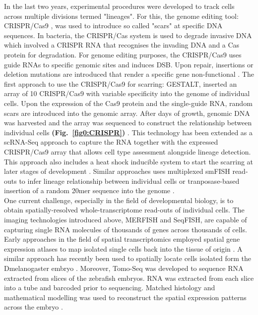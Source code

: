 In the last two years, experimental procedures were developed to track cells across multiple divisions termed "lineages". For this, the genome editing tool: \gls{CRISPR}/\gls{Cas9} \citep{Jinek2012}, was used to introduce so called "scars" at specific DNA sequences. In bacteria, the CRISPR/Cas system is used to degrade invasive DNA which involved a CRISPR RNA that recognises the invading DNA and a Cas protein for degradation. For genome editing purposes, the \gls{CRISPR}/\gls{Cas9} uses guide RNAs to specific genomic sites and induces \gls{DSB}. Upon repair, insertions or deletion mutations are introduced that render a specific gene non-functional \citep{Zhang2014c}. The first approach to use the 	\gls{CRISPR}/\gls{Cas9} for scarring: \gls{GESTALT}, inserted an array of 10 \gls{CRISPR}/\gls{Cas9} with variable specificity into the genome of individual cells. Upon the expression of the Cas9 protein and the single-guide RNA, random scars are introduced into the genomic array. After days of growth, genomic DNA was harvested and the array was sequenced to construct the relationship between individual cells \textbf{(Fig.~\ref{fig0:CRISPR})} \citep{McKenna2016}. This technology has been extended as a scRNA-Seq approach to capture the RNA together with the expressed \gls{CRISPR}/\gls{Cas9} array that allows cell type assessment alongside lineage detection. This approach also includes a heat shock inducible system to start the scarring at later stages of development \citep{Raj2018}. Similar approaches uses multiplexed smFISH read-outs to infer lineage relationship between individual cells \citep{Frieda2017} or tranposase-based insertion of a random 20mer sequence into the genome \citep{Wagner2018}.\\

One current challenge, especially in the field of developmental biology, is to obtain spatially-resolved whole-transcriptome read-outs of individual cells. The imaging technologies introduced above, MERFISH and SeqFISH, are capable of capturing single RNA molecules of thousands of genes across thousands of cells. Early approaches in the field of spatial transcriptomics employed spatial gene expression atlases to map isolated single cells back into the tissue of origin \citep{Achim2015, Satija2015a}. A similar approach has recently been used to spatially locate cells isolated form the \gls{Dmelanogaster} embryo \citep{Karaiskos2017}. Moreover, Tomo-Seq was developed to sequence RNA extracted from slices of the zebrafish embryos. RNA was extracted from each slice into a tube and barcoded prior to sequencing. Matched histology and mathematical modelling was used to reconstruct the spatial expression patterns across the embryo \citep{Junker2014a}.

